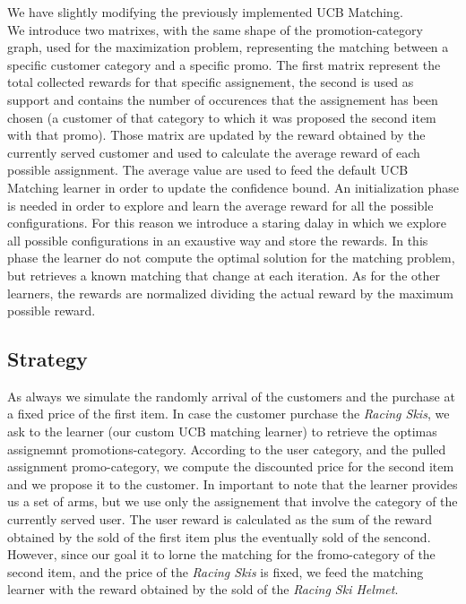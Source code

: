We have slightly modifying the previously implemented UCB Matching. \\
We introduce two matrixes, with the same shape of the promotion-category graph, used for the maximization problem, representing the matching between a specific customer category and a specific promo. The first matrix represent the total collected rewards for that specific assignement, the second is used as support and contains the number of occurences that the assignement has been chosen (a customer of that category to which it was proposed the second item with that promo). 
Those matrix are updated by the reward obtained by the currently served customer and used to calculate the average reward of each possible assignment. The average value are used to feed the default UCB Matching learner in order to update the confidence bound.
An initialization phase is needed in order to explore and learn the average reward for all the possible configurations. For this reason we introduce a staring dalay in which we explore all possible configurations in an exaustive way and store the rewards. In this phase the learner do not compute the optimal solution for the matching problem, but retrieves a known matching that change at each iteration.
As for the other learners, the rewards are normalized dividing the actual reward by the maximum possible reward.

\subsection*{Strategy}

As always we simulate the randomly arrival of the customers and the purchase at a fixed price of the first item. In case the customer purchase the \textit{Racing Skis}, we ask to the learner (our custom UCB matching learner) to retrieve the optimas assignemnt promotions-category. According to the user category, and the pulled assignment promo-category, we compute the discounted price for the second item and we propose it to the customer. In important to note that the learner provides us a set of arms, but we use only the assignement that involve the category of the currently served user. The user reward is calculated as the sum of the reward obtained by the sold of the first item plus the eventually sold of the sencond. However, since our goal it to lorne the matching for the fromo-category of the second item, and the price of the \textit{Racing Skis} is fixed, we feed the matching learner with the reward obtained by the sold of the \textit{Racing Ski Helmet}. 

